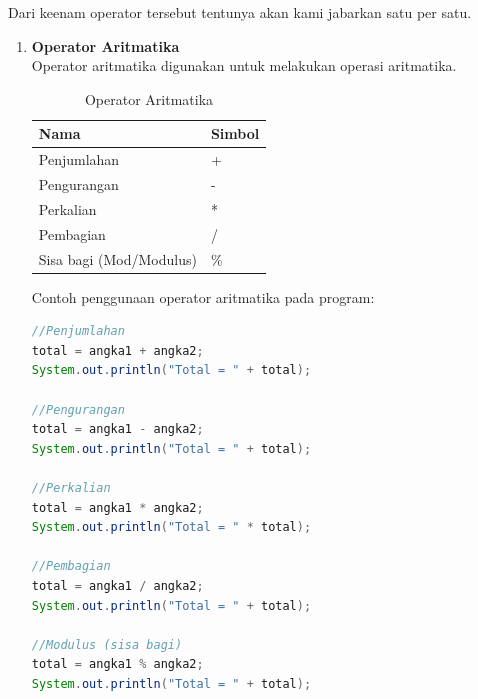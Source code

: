 Dari keenam operator tersebut tentunya akan kami jabarkan satu per satu. 
\begin{enumerate}
    \item \textbf{Operator Aritmatika}\\
    Operator aritmatika digunakan untuk melakukan operasi aritmatika.
    \begin{table}[h!]
        \begin{center}
            \begin{tabular}{|l|l|}
                \hline
                \rowcolor[HTML]{9AFF99} 
                \textbf{Nama}           & \textbf{Simbol} \\ \hline
                Penjumlahan             & +               \\ \hline
                Pengurangan             & -               \\ \hline
                Perkalian               & *               \\ \hline
                Pembagian               & /               \\ \hline
                Sisa bagi (Mod/Modulus) & \%              \\ \hline
                \end{tabular}
        \end{center}      
        \caption{Operator Aritmatika}
    \end{table}

    Contoh penggunaan operator aritmatika pada program:
    \begin{lstlisting}[language=Java]
//Penjumlahan
total = angka1 + angka2;
System.out.println("Total = " + total);

//Pengurangan
total = angka1 - angka2;
System.out.println("Total = " + total);

//Perkalian
total = angka1 * angka2;
System.out.println("Total = " * total);

//Pembagian
total = angka1 / angka2;
System.out.println("Total = " + total);

//Modulus (sisa bagi)
total = angka1 % angka2;
System.out.println("Total = " + total);
    \end{lstlisting}


\end{enumerate}
